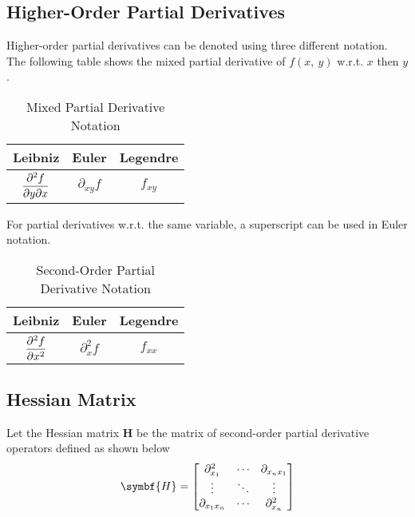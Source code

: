\documentclass{article}
\begin{document}
\subsection{Higher-Order Partial Derivatives}
\begin{definition}
    Higher-order partial derivatives can be denoted using three different
    notation. The following table shows the mixed partial derivative of
    $f(x,\: y)$ w.r.t. $x$ then $y$.
    \begin{table}[H]
        \centering
        \begin{tabular}{c c c}
            \toprule
            \textbf{Leibniz} & \textbf{Euler} & \textbf{Legendre} \\
            \midrule
            $\displaystyle\pdv{f}{y}{x}$ & $\partial_{x y}{f}$ & $f_{x y}$ \\
            \bottomrule
        \end{tabular}
        \caption{Mixed Partial Derivative Notation}
    \end{table}
    For partial derivatives w.r.t. the same variable, a superscript can be used
    in Euler notation.
    \begin{table}[H]
        \centering
        \begin{tabular}{c c c}
            \toprule
            \textbf{Leibniz} & \textbf{Euler} & \textbf{Legendre} \\
            \midrule
            $\displaystyle\pdv[2]{f}{x}$ & $\partial^2_{x}{f}$ & $f_{x x}$ \\
            \bottomrule
        \end{tabular}
        \caption{Second-Order Partial Derivative Notation}
    \end{table}
\end{definition}
\subsection{Hessian Matrix}
\begin{definition}
    Let the Hessian matrix $\symbf{H}$ be the matrix of second-order partial
    derivative operators defined as shown below
    \begin{equation*}
        \symbf{H} =
        \mqty[
            \partial^2_{x_1} & \cdots & \partial_{x_nx_1} \\
            \vdots & \ddots & \vdots \\
            \partial_{x_1x_n} & \cdots & \partial^2_{x_n}
        ]
    \end{equation*}
\end{definition}
\end{document}
